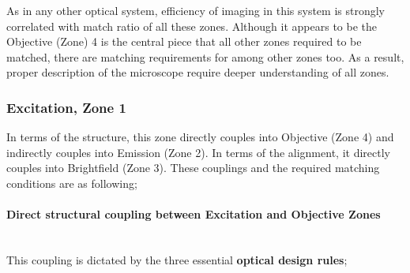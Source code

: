 As in any other optical system, efficiency of imaging in this system is strongly correlated with
match ratio of all these zones. Although it appears to be the Objective (Zone) 4 is the central
piece that all other zones required to be matched, there are matching requirements for among other
zones too. As a result, proper description of the microscope require deeper understanding of all
zones.

\subsubsection{Excitation, Zone 1}\label{subsubsec:excitationCouplings}
In terms of the structure, this zone directly couples into Objective (Zone 4) and indirectly couples 
into Emission (Zone 2). In terms of the alignment, it directly couples into Brightfield (Zone 3).
These couplings and the required matching conditions are as following;

\paragraph{Direct structural coupling between Excitation and Objective Zones}\mbox{}\\
This coupling is dictated by the three essential \textbf{optical design rules};

